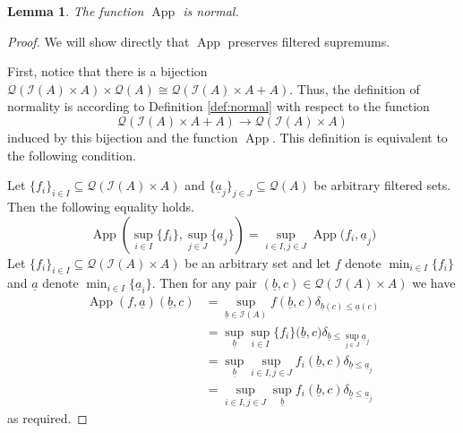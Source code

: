 \documentclass[12pt]{article}
\theoremstyle{plain}
\newtheorem{lemma}[thm]{Lemma}
\theoremstyle{definition}
\newcommand{\call}[1]{\mathcal{#1}}
\newcommand{\Ical}{\call{I}}
\newcommand{\Qcal}{\call{Q}}
\newcommand{\lto}{\longrightarrow}
\begin{document}
	\begin{lemma}\label{lem:app_normal}
		The function $\operatorname{App}$ is normal.
	\end{lemma}
	\begin{proof}
		We will show directly that $\operatorname{App}$ preserves filtered supremums.
		
		First, notice that there is a bijection $\Qcal(\Ical(A) \times A) \times \Qcal(A) \cong \Qcal(\Ical(A) \times A + A)$. Thus, the definition of normality is according to Definition \ref{def:normal} with respect to the function
		\begin{equation}
			\Qcal(\Ical(A) \times A + A) \lto \Qcal(\Ical(A) \times A)
		\end{equation}
		induced by this bijection and the function $\operatorname{App}$. This definition is equivalent to the following condition.
		
			Let $\{ f_i \}_{i \in I} \subseteq \Qcal(\Ical(A) \times A)$ and $\{{ \underline{a}_j }\}_{j \in J} \subseteq \Qcal(A)$ be arbitrary filtered sets. Then the following equality holds.
			\begin{equation}
				\operatorname{App}(\operatorname{sup}_{i \in I}\{ f_i \}, \operatorname{sup}_{j \in J}\{ \underline{a}_j \}) = \operatorname{sup}_{i \in I, j \in J}\operatorname{App}\big(f_i, \underline{a}_j\big)
			\end{equation}
		Let $\{ f_i \}_{i \in I} \subseteq \Qcal(\Ical(A) \times A)$ be an arbitrary set and let $f$ denote $\operatorname{min}_{i \in I}\{ f_i \}$ and $\underline{a}$ denote $\operatorname{min}_{i \in I}\{ \underline{a}_i \}$. Then for any pair $(\underline{b}, c) \in \Qcal(\Ical(A) \times A)$ we have
		\begin{align*}
			\operatorname{App}(f,\underline{a})(\underline{b}, c) &= \operatorname{sup}_{\underline{b} \in \Ical(A)}f(\underline{b}, c)\delta_{\underline{b}(c) \leq \underline{a}(c)}\\
			&=\operatorname{sup}_{\underline{b}} \operatorname{sup}_{i \in I}\{ f_i \}\big(\underline{b}, c\big) \delta_{\underline{b} \leq \operatorname{sup}_{j \in J}\underline{a}_j}\\
			&= \operatorname{sup}_{
			\underline{b}}\operatorname{sup}_{i \in I, j \in J}f_i(\underline{b}, c)\delta_{\underline{b} \leq \underline{a}_j}\\
			&= \operatorname{sup}_{i \in I, j \in J}\operatorname{sup}_{
				\underline{b}}f_i(\underline{b}, c)\delta_{\underline{b} \leq \underline{a}_j}
		\end{align*}
		as required.
	\end{proof}
	
\end{document}
